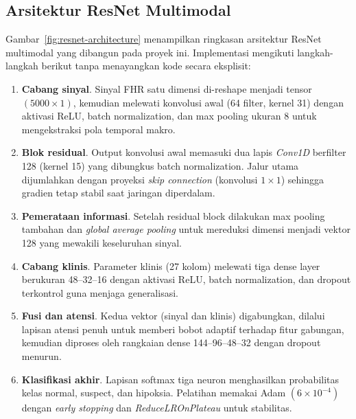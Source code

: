 \documentclass[12pt,a4paper]{article}
\begin{document}
\subsection{Arsitektur ResNet Multimodal}
Gambar~\ref{fig:resnet-architecture} menampilkan ringkasan arsitektur ResNet multimodal yang dibangun pada proyek ini. Implementasi mengikuti langkah-langkah berikut tanpa menayangkan kode secara eksplisit:
\begin{enumerate}[label=\alph*)]
    \item \textbf{Cabang sinyal}. Sinyal FHR satu dimensi di-reshape menjadi tensor $(5000 \times 1)$, kemudian melewati konvolusi awal (64 filter, kernel 31) dengan aktivasi ReLU, batch normalization, dan max pooling ukuran 8 untuk mengekstraksi pola temporal makro.
    \item \textbf{Blok residual}. Output konvolusi awal memasuki dua lapis \textit{Conv1D} berfilter 128 (kernel 15) yang dibungkus batch normalization. Jalur utama dijumlahkan dengan proyeksi \textit{skip connection} (konvolusi $1\times1$) sehingga gradien tetap stabil saat jaringan diperdalam.
    \item \textbf{Pemerataan informasi}. Setelah residual block dilakukan max pooling tambahan dan \textit{global average pooling} untuk mereduksi dimensi menjadi vektor 128 yang mewakili keseluruhan sinyal.
    \item \textbf{Cabang klinis}. Parameter klinis (27 kolom) melewati tiga dense layer berukuran 48--32--16 dengan aktivasi ReLU, batch normalization, dan dropout terkontrol guna menjaga generalisasi.
    \item \textbf{Fusi dan atensi}. Kedua vektor (sinyal dan klinis) digabungkan, dilalui lapisan atensi penuh untuk memberi bobot adaptif terhadap fitur gabungan, kemudian diproses oleh rangkaian dense 144--96--48--32 dengan dropout menurun.
    \item \textbf{Klasifikasi akhir}. Lapisan softmax tiga neuron menghasilkan probabilitas kelas normal, suspect, dan hipoksia. Pelatihan memakai Adam $(6\times10^{-4})$ dengan \textit{early stopping} dan \textit{ReduceLROnPlateau} untuk stabilitas.
\end{enumerate}
\end{document}
